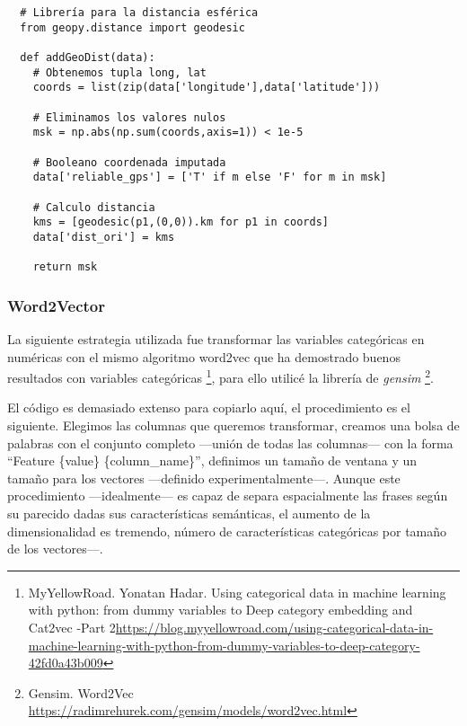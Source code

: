 \documentclass{article}
\newcommand{\img}[2]{
\noindent\makebox[\textwidth][c]{\texttt{[image: imgs/\#1]}}%
}
\begin{document}
\img{importance}{0.7}

\begin{verbatim}
  # Librería para la distancia esférica
  from geopy.distance import geodesic
  
  def addGeoDist(data):
    # Obtenemos tupla long, lat
    coords = list(zip(data['longitude'],data['latitude']))
    
    # Eliminamos los valores nulos
    msk = np.abs(np.sum(coords,axis=1)) < 1e-5
    
    # Booleano coordenada imputada
    data['reliable_gps'] = ['T' if m else 'F' for m in msk]
    
    # Calculo distancia
    kms = [geodesic(p1,(0,0)).km for p1 in coords]
    data['dist_ori'] = kms
    
    return msk
\end{verbatim}

\subsubsection{Word2Vector}

La siguiente estrategia utilizada fue transformar las variables categóricas en numéricas con el mismo algoritmo word2vec que ha demostrado buenos resultados con variables categóricas \footnote{MyYellowRoad. Yonatan Hadar. Using categorical data in machine learning with python: from dummy variables to Deep category embedding and Cat2vec -Part 2\url{https://blog.myyellowroad.com/using-categorical-data-in-machine-learning-with-python-from-dummy-variables-to-deep-category-42fd0a43b009}}, para ello utilicé la librería de \textit{gensim} \footnote{Gensim. Word2Vec \url{https://radimrehurek.com/gensim/models/word2vec.html}}.

El código es demasiado extenso para copiarlo aquí, el procedimiento es el siguiente. Elegimos las columnas que queremos transformar, creamos una bolsa de palabras con el conjunto completo ---unión de todas las columnas--- con la forma ``Feature \{value\} \{column\_name\}'', definimos un tamaño de ventana y un tamaño para los vectores ---definido experimentalmente---. Aunque este procedimiento ---idealmente--- es capaz de separa espacialmente las frases según su parecido dadas sus características semánticas, el aumento de la dimensionalidad es tremendo, número de características categóricas por tamaño de los vectores---.
\end{document}
